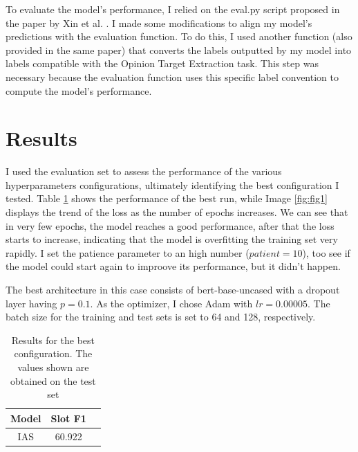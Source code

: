 \documentclass[a4paper]{article}
\begin{document}
To evaluate the model’s performance, I relied on the eval.py script proposed in the paper by Xin et al. \cite{li2019unifiedmodelopiniontarget}.
I made some modifications to align my model’s predictions with the evaluation function. To do this, I used another function (also provided in the same paper) that converts the labels outputted by my model into labels compatible with the Opinion Target Extraction task. This step was necessary because the evaluation function uses this specific label convention to compute the model’s performance.


\section{Results}
I used the evaluation set to assess the performance of the various hyperparameters configurations, ultimately identifying the best configuration I tested.
Table \ref{tab:results1} shows the performance of the best run, while Image \ref{fig:fig1} displays the trend of the loss as the number of epochs increases.
We can see that in very few epochs, the model reaches a good performance, after that the loss starts to increase, indicating that the model is overfitting the training set very rapidly.
I set the patience parameter to an high number (\(patient=10\)), too see if the model could start again to improove its performance, but it didn't happen.

The best architecture in this case consists of bert-base-uncased with a dropout layer having \(p=0.1\). As the optimizer, I chose Adam with \(lr=0.00005\). The batch size for the training and test sets is set to 64 and 128, respectively.


\begin{table}[h]
  \centering
  \begin{tabular}{|c|c|c|}
    \hline
    \textbf{Model} & \textbf{Slot F1} \\
    \hline
    IAS & 60.922 \\
    \hline
  \end{tabular}
  \caption{Results for the best configuration. The values shown are obtained on the test set}
  \label{tab:results1}

\end{table}
\end{document}
